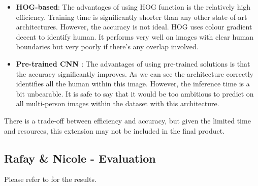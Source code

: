 \documentclass[11pt, letterpaper]{article}
\begin{document}
\begin{itemize}
    \item \textbf{HOG-based}: 
    The advantages of using HOG function is the relatively high efficiency. Training time is significantly shorter than any other state-of-art architectures. However, the accuracy is not ideal. HOG uses colour gradient decent to identify human. It performs very well on images with clear human boundaries but very poorly if there’s any overlap involved.	
    \item \textbf{Pre-trained CNN \cite{pre_trained_architecture}}: 
    The advantages of using pre-trained solutions is that the accuracy significantly improves. As we can see the architecture correctly identifies all the human within this image. However, the inference time is a bit unbearable. It is safe to say that it would be too ambitious to predict on all multi-person images within the dataset with this architecture. 
\end{itemize}

There is a trade-off between efficiency and accuracy, but given the limited time and resources, this extension may not be included in the final product.

\subsection{Rafay \& Nicole - Evaluation}
Please refer to  for the results.







\end{document}

